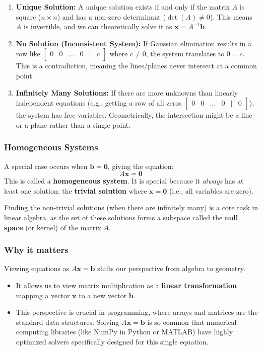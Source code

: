 \begin{enumerate}
    \item \textbf{Unique Solution:} A unique solution exists if and only if the matrix $A$ is square ($n \times n$) and has a non-zero determinant ($\det(A) \neq 0$). This means $A$ is invertible, and we can theoretically solve it as $\mathbf{x} = A^{-1}\mathbf{b}$.
    \item \textbf{No Solution (Inconsistent System):} If Gaussian elimination results in a row like $\begin{bmatrix} 0 & 0 & \dots & 0 & | & c \end{bmatrix}$ where $c \neq 0$, the system translates to $0 = c$. This is a contradiction, meaning the lines/planes never intersect at a common point.
    \item \textbf{Infinitely Many Solutions:} If there are more unknowns than linearly independent equations (e.g., getting a row of all zeros $\begin{bmatrix} 0 & 0 & \dots & 0 & | & 0 \end{bmatrix}$), the system has free variables. Geometrically, the intersection might be a line or a plane rather than a single point.
\end{enumerate}

\subsubsection*{Homogeneous Systems}

A special case occurs when $\mathbf{b} = \mathbf{0}$, giving the equation:
\[ A\mathbf{x} = \mathbf{0} \]
This is called a \textbf{homogeneous system}. 
It is special because it \emph{always} has at least one solution: the \textbf{trivial solution} where $\mathbf{x} = \mathbf{0}$ (i.e., all variables are zero). 

Finding the non-trivial solutions (when there are infinitely many) is a core task in linear algebra, as the set of these solutions forms a subspace called the \textbf{null space} (or kernel) of the matrix $A$.

\subsubsection*{Why it matters}
Viewing equations as $A\mathbf{x} = \mathbf{b}$ shifts our perspective from algebra to geometry. 
\begin{itemize}[leftmargin=*]
    \item It allows us to view matrix multiplication as a \textbf{linear transformation} mapping a vector $\mathbf{x}$ to a new vector $\mathbf{b}$. 
    \item This perspective is crucial in programming, where arrays and matrices are the standard data structures. Solving $A\mathbf{x} = \mathbf{b}$ is so common that numerical computing libraries (like NumPy in Python or MATLAB) have highly optimized solvers specifically designed for this single equation.
\end{itemize}
